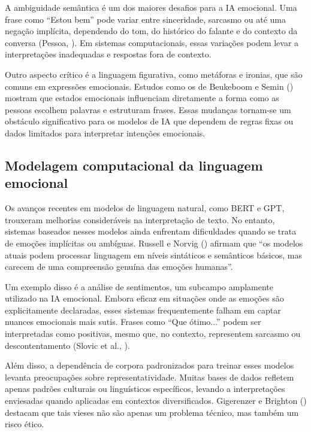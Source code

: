 \documentclass[a4paper,12pt]{report}
\begin{document}
	A ambiguidade semântica é um dos maiores desafios para a IA emocional. Uma frase como “Estou bem” pode variar entre sinceridade, sarcasmo ou até uma negação implícita, dependendo do tom, do histórico do falante e do contexto da conversa (Pessoa, \citeyear{pessoa2008}). Em sistemas computacionais, essas variações podem levar a interpretações inadequadas e respostas fora de contexto.
	
	Outro aspecto crítico é a linguagem figurativa, como metáforas e ironias, que são comuns em expressões emocionais. Estudos como os de Beukeboom e Semin (\citeyear{beukeboom2006}) mostram que estados emocionais influenciam diretamente a forma como as pessoas escolhem palavras e estruturam frases. Essas mudanças tornam-se um obstáculo significativo para os modelos de IA que dependem de regras fixas ou dados limitados para interpretar intenções emocionais.
	
	\subsection{Modelagem computacional da linguagem emocional}
	
	Os avanços recentes em modelos de linguagem natural, como BERT e GPT, trouxeram melhorias consideráveis na interpretação de texto. No entanto, sistemas baseados nesses modelos ainda enfrentam dificuldades quando se trata de emoções implícitas ou ambíguas. Russell e Norvig (\citeyear{russell2020}) afirmam que “os modelos atuais podem processar linguagem em níveis sintáticos e semânticos básicos, mas carecem de uma compreensão genuína das emoções humanas”.
	
	Um exemplo disso é a análise de sentimentos, um subcampo amplamente utilizado na IA emocional. Embora eficaz em situações onde as emoções são explicitamente declaradas, esses sistemas frequentemente falham em captar nuances emocionais mais sutis. Frases como “Que ótimo...” podem ser interpretadas como positivas, mesmo que, no contexto, representem sarcasmo ou descontentamento (Slovic et al., \citeyear{slovic2007}).
	
	Além disso, a dependência de corpora padronizados para treinar esses modelos levanta preocupações sobre representatividade. Muitas bases de dados refletem apenas padrões culturais ou linguísticos específicos, levando a interpretações enviesadas quando aplicadas em contextos diversificados. Gigerenzer e Brighton (\citeyear{gigerenzer2009}) destacam que tais vieses não são apenas um problema técnico, mas também um risco ético.
	
\end{document}
